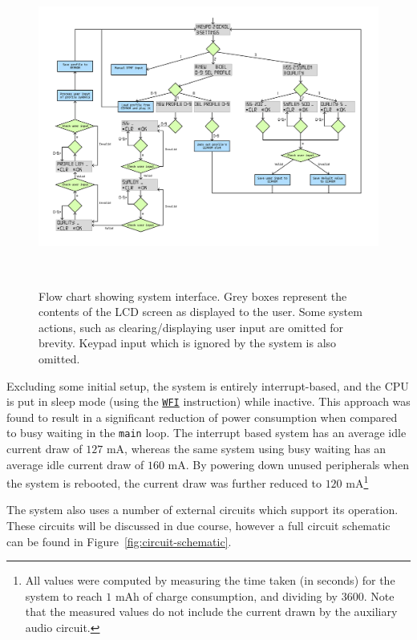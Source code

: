\documentclass[11pt,a4paper,twocolumn]{scrartcl}
\begin{document}
   \begin{figure}
      \centering
      \includegraphics[height=0.67\textheight, angle=90]{system_flow_chart}
      \caption{Flow chart showing system interface. Grey boxes represent the contents of the LCD screen as displayed to the user. Some system actions, such as clearing/displaying user input are omitted for brevity. Keypad input which is ignored by the system is also omitted.}~\label{fig:system-interface}
   \end{figure}

   Excluding some initial setup, the system is entirely interrupt-based, and the CPU is put in sleep mode (using the \href{https://developer.arm.com/documentation/dui0473/m/arm-and-thumb-instructions/wfi}{\Verb!WFI!} instruction) while inactive. This approach was found to result in a significant reduction of power consumption when compared to busy waiting in the \verb!main! loop. The interrupt based system has an average idle current draw of $127$ mA, whereas the same system using busy waiting has an average idle current draw of $160$ mA. By powering down unused peripherals when the system is rebooted, the current draw was further reduced to $120$ mA\footnote{All values were computed by measuring the time taken (in seconds) for the system to reach $1$ mAh of charge consumption, and dividing by $3600$. Note that the measured values do not include the current drawn by the auxiliary audio circuit.}

   The system also uses a number of external circuits which support its operation. These circuits will be discussed in due course, however a full circuit schematic can be found in Figure~\ref{fig:circuit-schematic}.
\end{document}
